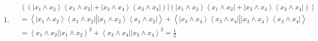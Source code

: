 \documentclass[aps,preprint]{revtex4}%
\begin{document}
\begin{enumerate}
\item
\begin{align}
&  \left\langle \left.  \left(  \left\vert x_{1}\wedge x_{2}\right\rangle
\left\langle x_{1}\wedge x_{2}\right\vert +\left\vert x_{3}\wedge
x_{4}\right\rangle \left\langle x_{3}\wedge x_{4}\right\vert \right)
\right\vert \left(  \left\vert x_{1}\wedge x_{2}\right\rangle \left\langle
x_{1}\wedge x_{2}\right\vert +\left\vert x_{3}\wedge x_{4}\right\rangle
\left\langle x_{3}\wedge x_{4}\right\vert \right)  \right\rangle \\
&  =\left\langle \left.  \overset{}{\left\vert x_{1}\wedge x_{2}\right\rangle
\left\langle x_{1}\wedge x_{2}\right\vert }\right\vert \overset{}{\left\vert
x_{1}\wedge x_{2}\right\rangle \left\langle x_{1}\wedge x_{2}\right\vert
}\right\rangle +\left\langle \left.  \overset{}{\left\vert x_{3}\wedge
x_{4}\right\rangle \left\langle x_{3}\wedge x_{4}\right\vert }\right\vert
\overset{}{\left\vert x_{3}\wedge x_{4}\right\rangle \left\langle x_{3}\wedge
x_{4}\right\vert }\right\rangle \\
&  =\left\langle x_{1}\wedge x_{2}\right\vert \left\vert x_{1}\wedge
x_{2}\right\rangle ^{2}+\left\langle x_{3}\wedge x_{4}\right\vert \left\vert
x_{3}\wedge x_{4}\right\rangle ^{2}=\frac{1}{2}%
\end{align}



\end{enumerate}
\end{document}
